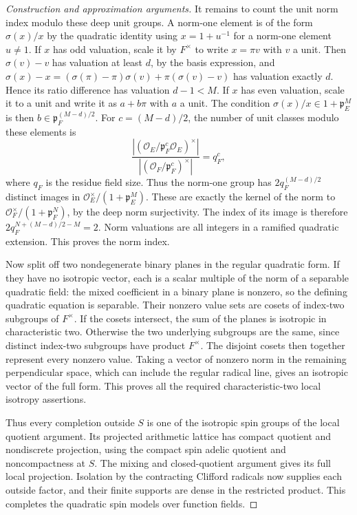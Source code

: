 \documentclass[11pt,a4paper,openany,oneside]{book}
\theoremstyle{resultstyle}
\theoremstyle{definition}
\numberwithin{equation}{chapter}
\begin{document}
\begin{proof}[Construction and approximation arguments]
It remains to count the unit norm index modulo
these deep unit groups. A norm-one element is of
the form \(\sigma(x)/x\) by the quadratic identity
using \(x=1+u^{-1}\) for a norm-one element \(u\ne1\).
If \(x\) has odd valuation, scale it by \(F^\times\)
to write \(x=\pi v\) with \(v\) a unit. Then
\(\sigma(v)-v\) has valuation at least \(d\),
by the basis expression, and
\(\sigma(x)-x=(\sigma(\pi)-\pi)\sigma(v)+
\pi(\sigma(v)-v)\) has valuation exactly \(d\).
Hence its ratio difference has valuation \(d-1<M\).
If \(x\) has even valuation, scale it to a unit and
write it as \(a+b\pi\) with \(a\) a unit.
The condition \(\sigma(x)/x\in1+\mathfrak p_E^M\)
is then \(b\in\mathfrak p_F^{(M-d)/2}\).
For \(c=(M-d)/2\), the number of unit classes modulo
these elements is
\[
 \frac{|(\mathcal O_E/\mathfrak p_F^c\mathcal O_E)^\times|}
 {|(\mathcal O_F/\mathfrak p_F^c)^\times|}
 =q_F^c ,
\]
where \(q_F\) is the residue field size.
Thus the norm-one group has
\(2q_F^{(M-d)/2}\) distinct images in
\(\mathcal O_E^\times/(1+\mathfrak p_E^M)\).
These are exactly the kernel of the norm to
\(\mathcal O_F^\times/(1+\mathfrak p_F^N)\),
by the deep norm surjectivity. The index of its
image is therefore
\(2q_F^{N+(M-d)/2-M}=2\).
Norm valuations are all integers in a ramified
quadratic extension. This proves the norm index.

Now split off two nondegenerate binary planes in
the regular quadratic form. If they have no isotropic
vector, each is a scalar multiple of the norm of a
separable quadratic field: the mixed coefficient
in a binary plane is nonzero, so the defining
quadratic equation is separable. Their nonzero
value sets are cosets of index-two subgroups of
\(F^\times\). If the cosets intersect, the sum of
the planes is isotropic in characteristic two.
Otherwise the two underlying subgroups are the
same, since distinct index-two subgroups have
product \(F^\times\). The disjoint cosets then
together represent every nonzero value. Taking a
vector of nonzero norm in the remaining perpendicular
space, which can include the regular radical line,
gives an isotropic vector of the full form. This
proves all the required characteristic-two local
isotropy assertions.

Thus every completion outside \(S\) is one of the
isotropic spin groups of the local quotient argument.
Its projected arithmetic lattice has compact quotient
and nondiscrete projection, using the compact spin
adelic quotient and noncompactness at \(S\).
The mixing and closed-quotient argument gives its
full local projection. Isolation by the contracting
Clifford radicals now supplies each outside factor,
and their finite supports are dense in the restricted
product. This completes the quadratic spin models
over function fields.


\end{proof}
\end{document}
